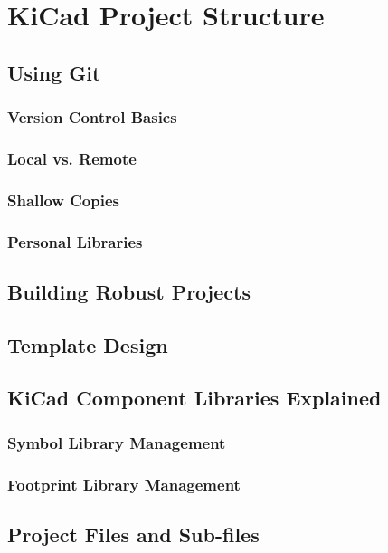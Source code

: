 
\chapter{KiCad Project Structure}
\label{ch:project-structure}

\section{Using Git}
\subsection{Version Control Basics}
\subsection{Local vs. Remote}
\subsection{Shallow Copies}
\subsection{Personal Libraries}

\section{Building Robust Projects}

\section{Template Design}

\section{KiCad Component Libraries Explained}
\subsection{Symbol Library Management}
\subsection{Footprint Library Management}

\section{Project Files and Sub-files}